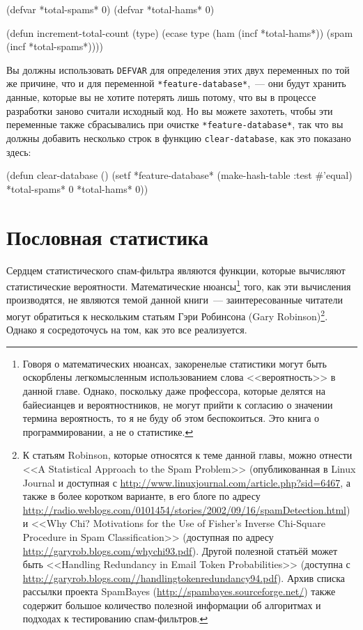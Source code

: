\begin{myverb}
(defvar *total-spams* 0)
(defvar *total-hams* 0)

(defun increment-total-count (type)
  (ecase type
    (ham (incf *total-hams*))
    (spam (incf *total-spams*))))
\end{myverb}

Вы должны использовать \lstinline{DEFVAR} для определения этих двух переменных по той же
причине, что и для переменной \lstinline{*feature-database*},~--- они будут хранить данные,
которые вы не хотите потерять лишь потому, что вы в процессе разработки заново считали
исходный код.  Но вы можете захотеть, чтобы эти переменные также сбрасывались при очистке
\lstinline{*feature-database*}, так что вы должны добавить несколько строк в функцию
\lstinline{clear-database}, как это показано здесь:

\begin{myverb}
(defun clear-database ()
  (setf
   *feature-database* (make-hash-table :test #'equal)
   *total-spams* 0
   *total-hams* 0))
\end{myverb}

\section{Пословная статистика}

Сердцем статистического спам-фильтра являются функции, которые вычисляют статистические
вероятности.  Математические нюансы\footnote{Говоря о математических нюансах, закоренелые
  статистики могут быть оскорблены легкомысленным использованием слова <<вероятность>> в
  данной главе.  Однако, поскольку даже профессора, которые делятся на
  байесианцев и вероятностников, не могут прийти к согласию о значении термина
  вероятность, то я не буду об этом беспокоиться.  Это книга о программировании, а не о
  статистике.} того, как эти вычисления производятся, не являются темой данной книги~---
заинтересованные читатели могут обратиться к нескольким статьям Гэри Робинсона (Gary Robinson)\footnote{К
  статьям Robinson, которые относятся к теме данной главы, можно отнести <<A Statistical
  Approach to the Spam Problem>> (опубликованная в Linux Journal и доступная с
  \url{http://www.linuxjournal.com/article.php?sid=6467}, а также в более коротком
  варианте, в его блоге по адресу
  \url{http://radio.weblogs.com/0101454/stories/2002/09/16/spamDetection.html}) и <<Why
  Chi?  Motivations for the Use of Fisher's Inverse Chi-Square Procedure in Spam
  Classification>> (доступная по адресу \url{http://garyrob.blogs.com/whychi93.pdf}).
  Другой полезной статьёй может быть <<Handling Redundancy in Email Token Probabilities>>
  (доступна с \url{http://garyrob.blogs.com//handlingtokenredundancy94.pdf}).  Архив
  списка рассылки проекта SpamBayes (\url{http://spambayes.sourceforge.net/}) также
  содержит большое количество полезной информации об алгоритмах и подходах к тестированию
  спам-фильтров.}. Однако я сосредоточусь на том, как это все реализуется.

